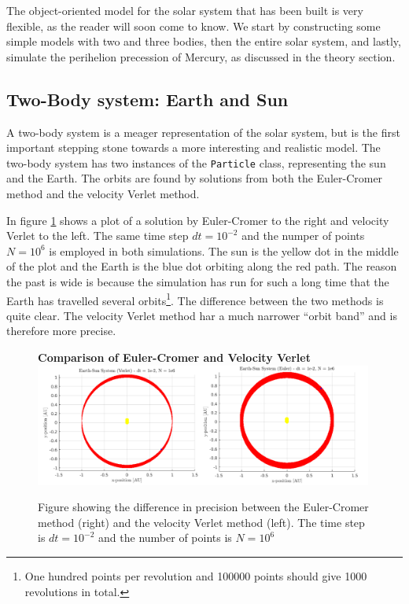 \documentclass[10pt,a4paper]{amsart}
\begin{document}
The object-oriented model for the solar system that has been built is very flexible, as the reader will soon come to know. We start by constructing some simple models with two and three bodies, then the entire solar system, and lastly, simulate the perihelion precession of Mercury, as discussed in the theory section.

\subsection{Two-Body system: Earth and Sun}

A two-body system is a meager representation of the solar system, but is the first important stepping stone towards a more interesting and realistic model. The two-body system has two instances of the \lstinline|Particle| class, representing the sun and the Earth. The orbits are found by solutions from both the Euler-Cromer method and the velocity Verlet method. 

In figure \ref{fig:earthcompare} shows a plot of a solution by Euler-Cromer to the right and velocity Verlet to the left. The same time step $dt=10^{-2}$ and the numper of points $N=10^6$ is employed in both simulations. The sun is the yellow dot in the middle of the plot and the Earth is the blue dot orbiting along the red path. The reason the past is wide is because the simulation has run for such a long time that the Earth has travelled several orbits\footnote{One hundred points per revolution and 100000 points should give 1000 revolutions in total.}. The difference between the two methods is quite clear. The velocity Verlet method har a much narrower ``orbit band'' and is therefore more precise.

\begin{figure}
	\centering
	\textbf{Comparison of Euler-Cromer and Velocity Verlet}
	\includegraphics[width=0.99\textwidth]{../figures/earthcompare.png}
	\caption{Figure showing the difference in precision between the Euler-Cromer method (right) and the velocity Verlet method (left). The time step is $dt=10^{-2}$ and the number of points is $N=10^6$\label{fig:earthcompare}}
\end{figure}
\end{document}
